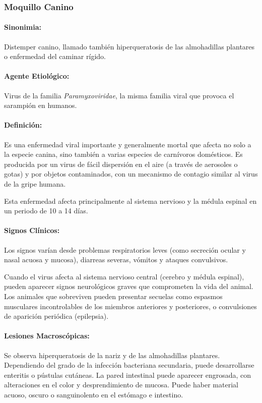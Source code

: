         \subsubsection{Moquillo Canino}

            \paragraph{Sinonimia:} Distemper canino, llamado también hiperqueratosis de las almohadillas plantares o enfermedad del caminar rígido.

            \paragraph{Agente Etiológico:} Virus de la familia \emph{Paramyxoviridae}, la misma familia viral que provoca el sarampión en humanos.

            \paragraph{Definición:} Es una enfermedad viral importante y generalmente mortal que afecta no solo a la especie canina, sino también a varias especies de carnívoros domésticos. Es producida por un virus de fácil dispersión en el aire (a través de aerosoles o gotas) y por objetos contaminados, con un mecanismo de contagio similar al virus de la gripe humana.

            Esta enfermedad afecta principalmente al sistema nervioso y la médula espinal en un periodo de 10 a 14 días.

            \paragraph{Signos Clínicos:} Los signos varían desde problemas respiratorios leves (como secreción ocular y nasal acuosa y mucosa), diarreas severas, vómitos y ataques convulsivos.

			Cuando el virus afecta al sistema nervioso central (cerebro y médula espinal), pueden aparecer signos neurológicos graves que comprometen la vida del animal. Los animales que sobreviven pueden presentar secuelas como espasmos musculares incontrolables de los miembros anteriores y posteriores, o convulsiones de aparición periódica (epilepsia).

            \paragraph{Lesiones Macroscópicas:} Se observa hiperqueratosis de la nariz y de las almohadillas plantares. Dependiendo del grado de la infección bacteriana secundaria, puede desarrollarse enteritis o pústulas cutáneas. La pared intestinal puede aparecer engrosada, con alteraciones en el color y desprendimiento de mucosa. Puede haber material acuoso, oscuro o sanguinolento en el estómago e intestino.

